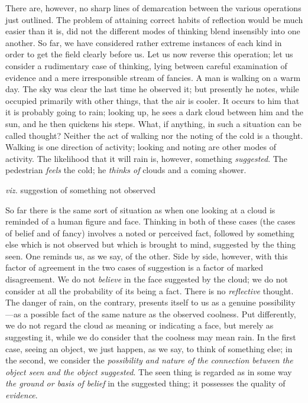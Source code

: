 \documentclass[letterpaper]{book}
\begin{document}
There are, however, no sharp lines of demarcation between the various
operations just outlined. The problem of attaining correct habits of
reflection would be much easier than it is, did not the different modes
of thinking blend insensibly into one another. So far, we have
considered rather extreme instances of each kind in order to get the
field clearly before us. Let us now reverse this operation; let us
consider a rudimentary case of thinking, lying between careful
examination of evidence and a mere irresponsible stream of fancies. A
man is walking on a warm day. The sky was clear the last time he
observed it; but presently he notes, while occupied primarily with other
things, that the air is cooler. It occurs to him that it is probably
going
to
rain; looking up, he sees a dark cloud between him and the sun, and he
then quickens his steps. What, if anything, in such a situation can be
called thought? Neither the act of walking nor the noting of the cold is
a thought. Walking is one direction of activity; looking and noting are
other modes of activity. The likelihood that it will rain is, however,
something \emph{suggested}. The pedestrian \emph{feels} the cold; he
\emph{thinks of} clouds and a coming shower.

\emph{viz.} suggestion of something not observed


So far there is the same sort of situation as when one looking at a
cloud is reminded of a human figure and face. Thinking in both of these
cases (the cases of belief and of fancy) involves a noted or perceived
fact, followed by something else which is not observed but which is
brought to mind, suggested by the thing seen. One reminds us, as we say,
of the other. Side by side, however, with this factor of agreement in
the two cases of suggestion is a factor of marked disagreement. We do
not \emph{believe} in the face suggested by the cloud; we do not
consider at all the probability of its being a fact. There is no
\emph{reflective} thought. The danger of rain, on the contrary, presents
itself to us as a genuine possibility---as a possible fact of the same
nature as the observed coolness. Put differently, we do not regard the
cloud as meaning or indicating a face, but merely as suggesting it,
while we do consider that the coolness may mean rain. In the first case,
seeing an object, we just happen, as we say, to think of something else;
in the second, we consider the \emph{possibility and nature of the
connection between the object seen and the object suggested}. The seen
thing is regarded as in some way \emph{the ground or basis of belief} in
the suggested thing; it possesses the quality of
\emph{evidence}.
\end{document}
